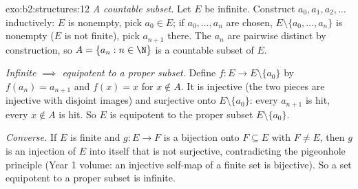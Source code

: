 \begin{solution}{exo:b2:structures:12}
\emph{A countable subset.} Let $E$ be infinite. Construct $a_0,
a_1, a_2, \dots$ inductively: $E$ is nonempty, pick $a_0 \in E$;
if $a_0, \dots, a_n$ are chosen, $E \setminus \{a_0, \dots,
a_n\}$ is nonempty ($E$ is not finite), pick $a_{n+1}$ there. The
$a_n$ are pairwise distinct by construction, so $A = \{a_n : n
\in \N\}$ is a countable subset of $E$.

\emph{Infinite $\implies$ equipotent to a proper subset.} Define
$f \colon E \to E \setminus \{a_0\}$ by $f(a_n) = a_{n+1}$ and
$f(x) = x$ for $x \notin A$. It is injective (the two pieces are
injective with disjoint images) and surjective onto $E \setminus
\{a_0\}$: every $a_{n+1}$ is hit, every $x \notin A$ is hit. So
$E$ is equipotent to the proper subset $E \setminus \{a_0\}$.

\emph{Converse.} If $E$ is finite and $g \colon E \to F$ is a
bijection onto $F \subseteq E$ with $F \neq E$, then $g$ is an
injection of $E$ into itself that is not surjective,
contradicting the pigeonhole principle (Year 1 volume: an
injective self-map of a finite set is bijective). So a set
equipotent to a proper subset is infinite.
\end{solution}

